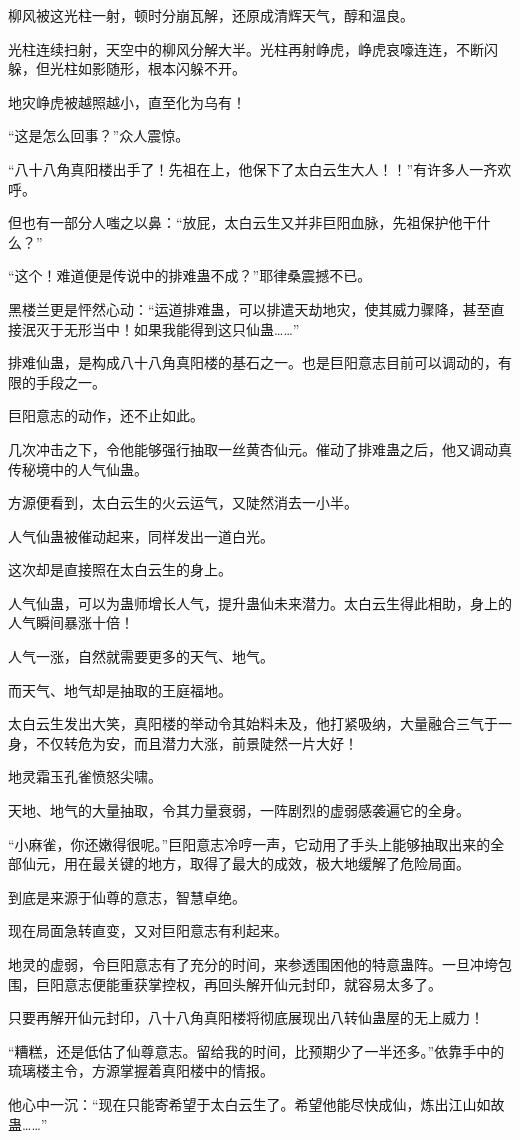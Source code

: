 \begin{this_body}
柳风被这光柱一射，顿时分崩瓦解，还原成清辉天气，醇和温良。

光柱连续扫射，天空中的柳风分解大半。光柱再射峥虎，峥虎哀嚎连连，不断闪躲，但光柱如影随形，根本闪躲不开。

地灾峥虎被越照越小，直至化为乌有！

“这是怎么回事？”众人震惊。

“八十八角真阳楼出手了！先祖在上，他保下了太白云生大人！！”有许多人一齐欢呼。

但也有一部分人嗤之以鼻：“放屁，太白云生又并非巨阳血脉，先祖保护他干什么？”

“这个！难道便是传说中的排难蛊不成？”耶律桑震撼不已。

黑楼兰更是怦然心动：“运道排难蛊，可以排遣天劫地灾，使其威力骤降，甚至直接泯灭于无形当中！如果我能得到这只仙蛊……”

排难仙蛊，是构成八十八角真阳楼的基石之一。也是巨阳意志目前可以调动的，有限的手段之一。

巨阳意志的动作，还不止如此。

几次冲击之下，令他能够强行抽取一丝黄杏仙元。催动了排难蛊之后，他又调动真传秘境中的人气仙蛊。

方源便看到，太白云生的火云运气，又陡然消去一小半。

人气仙蛊被催动起来，同样发出一道白光。

这次却是直接照在太白云生的身上。

人气仙蛊，可以为蛊师增长人气，提升蛊仙未来潜力。太白云生得此相助，身上的人气瞬间暴涨十倍！

人气一涨，自然就需要更多的天气、地气。

而天气、地气却是抽取的王庭福地。

太白云生发出大笑，真阳楼的举动令其始料未及，他打紧吸纳，大量融合三气于一身，不仅转危为安，而且潜力大涨，前景陡然一片大好！

地灵霜玉孔雀愤怒尖啸。

天地、地气的大量抽取，令其力量衰弱，一阵剧烈的虚弱感袭遍它的全身。

“小麻雀，你还嫩得很呢。”巨阳意志冷哼一声，它动用了手头上能够抽取出来的全部仙元，用在最关键的地方，取得了最大的成效，极大地缓解了危险局面。

到底是来源于仙尊的意志，智慧卓绝。

现在局面急转直变，又对巨阳意志有利起来。

地灵的虚弱，令巨阳意志有了充分的时间，来参透围困他的特意蛊阵。一旦冲垮包围，巨阳意志便能重获掌控权，再回头解开仙元封印，就容易太多了。

只要再解开仙元封印，八十八角真阳楼将彻底展现出八转仙蛊屋的无上威力！

“糟糕，还是低估了仙尊意志。留给我的时间，比预期少了一半还多。”依靠手中的琉璃楼主令，方源掌握着真阳楼中的情报。

他心中一沉：“现在只能寄希望于太白云生了。希望他能尽快成仙，炼出江山如故蛊……”

\end{this_body}

